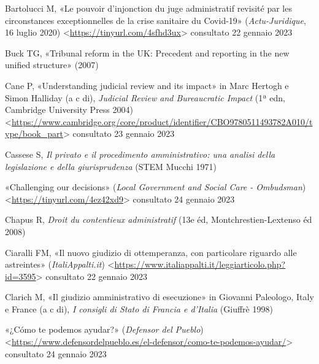 \documentclass[12pt,it,a4paper,]{report}
\newlength{\cslhangindent}
\newenvironment{CSLReferences}[2] %
 {%
  \setlength{\parindent}{0pt}
  \ifodd #1 \everypar{\setlength{\hangindent}{\cslhangindent}}\ignorespaces\fi
  \ifnum #2 > 0
  \setlength{\parskip}{#2\baselineskip}
  \fi
 }%
 {}
\begin{document}
\hypertarget{refs}{}
\begin{CSLReferences}{0}{0}
\leavevmode{}%
Bartolucci M, {«Le pouvoir d'injonction du juge administratif revisité
par les circonstances exceptionnelles de la crise sanitaire du
Covid-19»} (\emph{Actu-Juridique}, 16 luglio 2020)
\textless{}\url{https://tinyurl.com/4sfhd3ux}\textgreater{} consultato
22 gennaio 2023

\leavevmode{}%
Buck TG, {«Tribunal reform in the UK: Precedent and reporting in the new
unified structure»} (2007)

\leavevmode{}%
Cane P, {«Understanding judicial review and its impact»} in Marc Hertogh
e Simon Halliday (a c di), \emph{Judicial Review and Bureaucratic
Impact} (1ª edn, Cambridge University Press 2004)
\textless{}\url{https://www.cambridge.org/core/product/identifier/CBO9780511493782A010/type/book_part}\textgreater{}
consultato 23 gennaio 2023

\leavevmode{}%
Cassese S, \emph{Il privato e il procedimento amministrativo: una
analisi della legislazione e della giurisprudenza} (STEM Mucchi 1971)

\leavevmode{}%
{«Challenging our decisions»} (\emph{Local Government and Social Care -
Ombudsman}) \textless{}\url{https://tinyurl.com/4ez42xd9}\textgreater{}
consultato 24 gennaio 2023

\leavevmode{}%
Chapus R, \emph{Droit du contentieux administratif} (13e éd,
Montchrestien-Lextenso éd 2008)

\leavevmode{}%
Ciaralli FM, {«Il nuovo giudizio di ottemperanza, con particolare
riguardo alle astreintes»} (\emph{ItaliAppalti.it})
\textless{}\url{https://www.italiappalti.it/leggiarticolo.php?id=3595}\textgreater{}
consultato 22 gennaio 2023

\leavevmode{}%
Clarich M, {«Il giudizio amministrativo di esecuzione»} in Giovanni
Paleologo, Italy e France (a c di), \emph{I consigli di Stato di Francia
e d'Italia} (Giuffrè 1998)

\leavevmode{}%
{«¿Cómo te podemos ayudar?»} (\emph{Defensor del Pueblo})
\textless{}\url{https://www.defensordelpueblo.es/el-defensor/como-te-podemos-ayudar/}\textgreater{}
consultato 24 gennaio 2023


\end{CSLReferences}
\end{document}
